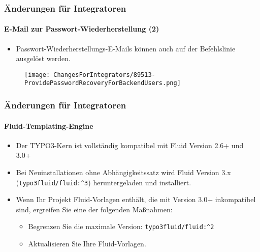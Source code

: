 
\begin{frame}[fragile]
	\frametitle{Änderungen für Integratoren}
	\framesubtitle{E-Mail zur Passwort-Wiederherstellung (2)}

	\begin{itemize}
		\item Passwort-Wiederherstellungs-E-Mails können auch auf der Befehlslinie ausgelöst werden.
	\end{itemize}

	\begin{figure}
		\texttt{[image: ChangesForIntegrators/89513-ProvidePasswordRecoveryForBackendUsers.png]}
	\end{figure}

\end{frame}


\begin{frame}[fragile]
	\frametitle{Änderungen für Integratoren}
	\framesubtitle{Fluid-Templating-Engine}

	\begin{itemize}
		\item Der TYPO3-Kern ist vollständig kompatibel mit Fluid Version 2.6+ und 3.0+
		\item Bei Neuinstallationen ohne Abhängigkeitssatz wird Fluid Version 3.x
			(\texttt{typo3fluid/fluid:\^{}3}) heruntergeladen und installiert.
		\item Wenn Ihr Projekt Fluid-Vorlagen enthält, die mit Version 3.0+ inkompatibel sind,
			ergreifen Sie eine der folgenden Maßnahmen:

			\begin{itemize}
				\item Begrenzen Sie die maximale Version: \texttt{typo3fluid/fluid:\^{}2}
				\item Aktualisieren Sie Ihre Fluid-Vorlagen.
			\end{itemize}

	\end{itemize}

\end{frame}


